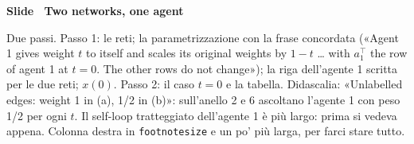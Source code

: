 \par\addvspace{14pt}\noindent\begin{minipage}{\textwidth}
{\color{unipd}\bfseries Slide  \textperiodcentered\ Two networks, one agent}\par\smallskip
{\small Due passi. Passo 1: le reti; la parametrizzazione con la frase concordata («Agent 1 gives weight $t$ to itself and scales its original weights by $1-t$ … with $a_1^\top$ the row of agent 1 at $t = 0$. The other rows do not change»); la riga dell'agente 1 scritta per le due reti; $x(0)$. Passo 2: il caso $t = 0$ e la tabella. Didascalia: «Unlabelled edges: weight 1 in (a), 1/2 in (b)»: sull'anello 2 e 6 ascoltano l'agente 1 con peso 1/2 per ogni $t$. Il self-loop tratteggiato dell'agente 1 è più largo: prima si vedeva appena. Colonna destra in \texttt{footnotesize} e un po' più larga, per farci stare tutto.}\par\smallskip
\noindent\begin{minipage}[t]{0.36\textwidth}\par
{}\par\smallskip
\end{minipage}\hfill\begin{minipage}[t]{0.61\textwidth}\par
{}\par\smallskip
{}\par\smallskip
\end{minipage}\par
\end{minipage}\par
